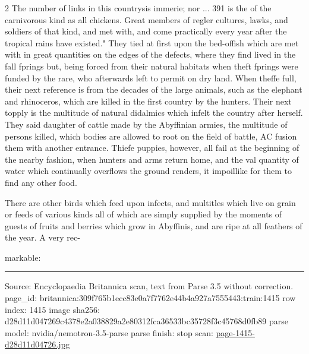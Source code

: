 \documentclass[10pt]{article}
\begin{document}
\begin{multicols}{2}
The number of links in this countrysis immerie; nor ... 391 is the of the carnivorous kind as all chickens. Great members of regler cultures, lawks, and soldiers of that kind, and met with, and come practically every year after the tropical rains have existed." They tied at first upon the bed-offish which are met with in great quantities on the edges of the defects, where they find lived in the fall fprings but, being forced from their natural habitats when theft fprings were funded by the rare, who afterwards left to permit on dry land. When theffe full, their next reference is from the decades of the large animals, such as the elephant and rhinoceros, which are killed in the first country by the hunters. Their next topply is the multitude of natural didalmics which infelt the country after herself. They said daughter of cattle made by the Abyffinian armies, the multitude of persons killed, which bodies are allowed to root on the field of battle, AC fusion them with another entrance. Thiefe puppies, however, all fail at the beginning of the nearby fashion, when hunters and arms return home, and the val quantity of water which continually overflows the ground renders, it impoillike for them to find any other food.

There are other birds which feed upon infects, and multitles which live on grain or feeds of various kinds all of which are simply supplied by the moments of guests of fruits and berries which grow in Abyffinis, and are ripe at all feathers of the year. A very rec-

markable:

\end{multicols}
\vfill\par\noindent\rule{\linewidth}{0.4pt}\par
{\scriptsize\color{gray}\noindent Source: Encyclopaedia Britannica scan, text from Parse 3.5 without correction. page\_id: britannica:309f765b1ecc83e0a7f7762e44b4a927a7555443:train:1415 \quad row index: 1415 \quad image sha256: d28d11d047269c4378e2a038829a2e80312fca36533bc35728f3c45768d0fb89 \quad parse model: nvidia/nemotron-3.5-parse \quad parse finish: stop \quad scan: \href{../scans/page-1415-d28d11d04726.jpg}{page-1415-d28d11d04726.jpg}\par}
\end{document}

